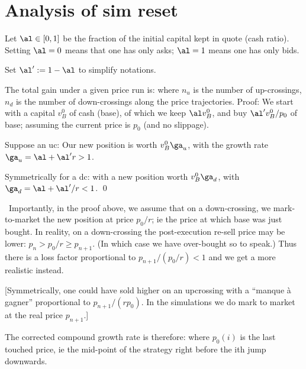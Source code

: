 \documentclass[oneside,twocolumn,12pt]{article}
\begin{document}
\section{Analysis of sim reset}

Let $\al\in[0,1]$ be the fraction of the initial capital kept in quote (cash ratio).
Setting $\al=0$ means that one has only asks; $\al=1$ means one has only bids.

Set $\al':=1-\al$ to simplify notations.

\PRO 
The total gain under a given price run is:
where $n_u$ is the number of up-crossings, $n_d$
is the number of down-crossings along the price trajectories.
\ORP
Proof:
We start with a capital $v^0_B$ of cash (base),
of which we keep $\al v^0_B$, 
and buy $\al'v^0_B/p_0$ of base; assuming the current price is $p_0$ (and no slippage). 

Suppose an uc:
Our new position is worth $v^0_B\ga_u$,
with the growth rate $\ga_u=\al+ \al'r>1$.

Symmetrically for a dc:
with a new position worth $v^0_B\ga_d$, with $\ga_d=\al+ \al'/r<1$.
\qed

\NB\ Importantly, in the proof above, 
we assume that on a down-crossing,
we mark-to-market the new position at price $p_0/r$;
ie the price at which base was just bought. 
In reality, on a down-crossing the post-execution re-sell price may be lower:
$p_n>p_0/r\geq p_{n+1}$. (In which case we have over-bought so to speak.)
Thus there is a loss factor proportional to $p_{n+1}/(p_0/r)<1$ and we get 
a more realistic 
instead.

[Symmetrically,
one could have sold higher on an upcrossing with a ``manque à gagner'' proportional 
to $p_{n+1}/(rp_0)$. In the simulations we do mark to market at the real price $p_{n+1}$.]

The corrected compound growth rate is therefore:
where $p_0(i)$ is the last touched price, ie the mid-point of the strategy right before the
ith jump downwards.
\end{document}
